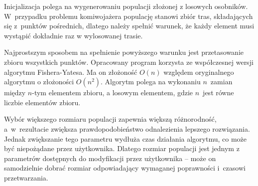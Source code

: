 Inicjalizacja polega na wygenerowaniu populacji złożonej z losowych osobników. W~przypadku problemu komiwojażera populację stanowi zbiór tras, składających się z~punktów pośrednich, dlatego należy spełnić warunek, że każdy element musi wystąpić dokładnie raz w wylosowanej trasie.

Najprostszym sposobem na spełnienie powyższego warunku jest przetasowanie zbioru wszystkich punktów. Opracowany program korzysta ze współczesnej wersji algorytmu Fishera-Yatesa\cite{shuffle}. Ma on złożoność $O(n)$ względem oryginalnego algorytmu o złożoności $O(n^{2})$. Algorytm polega na wykonaniu $n$~zamian między $n$-tym elementem zbioru, a losowym elementem, gdzie $n$~jest równe liczbie elementów zbioru.

Wybór większego rozmiaru populacji zapewnia większą różnorodność, a~w~rezultacie zwiększa prawdopodobieństwo odnalezienia lepszego rozwiązania. Jednak zwiększanie tego parametru wydłuża czas działania algorytmu, co może być niepożądane przez użytkownika. Dlatego rozmiar populacji jest jednym z parametrów dostępnych do modyfikacji przez użytkownika -- może on samodzielnie dobrać rozmiar odpowiadający wymaganej poprawności i~czasowi przetwarzania.